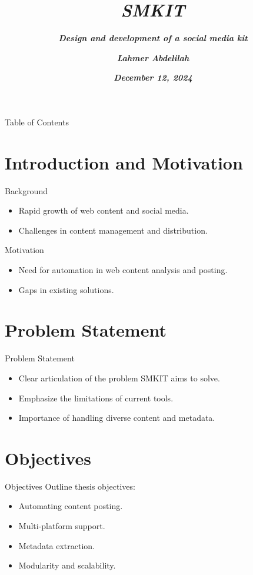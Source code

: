 \documentclass{beamer}
\title{ \textbf{ \textit{SMKIT} } }
\subtitle{ \textbf{ \textit{Design and development of a social media kit} } }
\author[ \textbf{ \textit{Abdelilah Lahmer} } ]{ \textbf{ \textit{Lahmer Abdelilah} } }
\date{ \textbf{ \textit{December 12, 2024} } }
\begin{document}
\frame{\titlepage}

\begin{frame}{Table of Contents}
    \tableofcontents    
\end{frame}


\section{Introduction and Motivation}
    \begin{frame}{Background}
        \begin{itemize}
            \item Rapid growth of web content and social media.
            \item Challenges in content management and distribution.
        \end{itemize}
    \end{frame}

    \begin{frame}{Motivation}
        \begin{itemize}
            \item Need for automation in web content analysis and posting.
            \item Gaps in existing solutions.
        \end{itemize}
    \end{frame}


\section{Problem Statement}
    \begin{frame}{Problem Statement}
        \begin{itemize}
            \item Clear articulation of the problem SMKIT aims to solve.
            \item Emphasize the limitations of current tools.
            \item Importance of handling diverse content and metadata.
        \end{itemize}
    \end{frame}


\section{Objectives}
    \begin{frame}{Objectives}
        Outline thesis objectives:
        \begin{itemize}
            \item Automating content posting.
            \item Multi-platform support.
            \item Metadata extraction.
            \item Modularity and scalability.
        \end{itemize}
    \end{frame}
\end{document}
